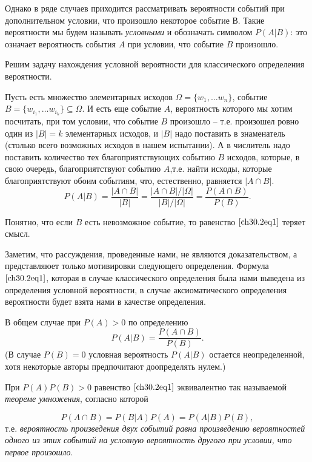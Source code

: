 Однако в ряде случаев приходится рассматривать вероятности событий при дополнительном условии, что произошло некоторое событие В. Такие вероятности мы будем называть \textit{условными} и обозначать символом $P(A|B)$: это означает вероятность события $A$ при условии, что событие $B$ произошло.
 
Решим задачу нахождения условной вероятности для классического определения вероятности.

Пусть есть множество элементарных исходов $\Omega=\{w_1,\dots w_n\}$, событие $B=\{w_{i_1},\dots w_{i_k}\} \subseteq \Omega$. И есть еще событие $A$, вероятность которого мы хотим посчитать, при том условии, что событие $B$ произошло -- т.е. произошел ровно один из $|B|=k$ элементарных исходов, и $|B|$ надо поставить в знаменатель (столько всего возможных исходов в нашем испытании). А в числитель надо поставить количество тех благоприятствующих событию $B$ исходов, которые, в свою очередь, благоприятствуют событию $A$,т.е. найти исходы, которые благоприятствуют обоим событиям, что, естественно, равняется $|A\cap B|$.
\begin{equation} \label{ch30.2eq1}
P(A|B) = \frac{|A\cap B|}{|B|} = \frac{|A\cap B|/|\Omega|}{|B|/|\Omega|} = \frac{P(A\cap B)}{P(B)}.
\end{equation}

Понятно, что если $B$ есть невозможное событие, то равенство $\eqref{ch30.2eq1}$ теряет смысл.

Заметим, что рассуждения, проведенные нами, не являются доказательством, а представляюет только мотивировки следующего определения.
Формула $\eqref{ch30.2eq1}$, которая в случае классического определения была нами выведена из определения условной вероятности, в случае аксиоматического определения вероятности будет взята нами в качестве определения. 
\begin{defn} В общем случае при $P(A) > 0$ по определению
$$
P(A|B) = \frac{P(A\cap B)}{P(B)}.
$$
(В случае $P(B) = 0$ условная вероятность $P(A|B)$ остается неопределенной, хотя некоторые авторы предпочитают доопределять нулем.)
\end{defn}

При $P(A)P(B) > 0$ равенство $\eqref{ch30.2eq1}$ эквивалентно так называемой \textit{теореме умножения}, согласно которой

\begin{equation} \label{ch30.2eq2}
P(A\cap B) = P(B|A)P(A) = P(A|B)P(B),
\end{equation}
т.е. \textit{вероятность произведения двух событий равна произведению вероятностей одного из этих событий на условную вероятность другого при условии, что первое произошло}.

